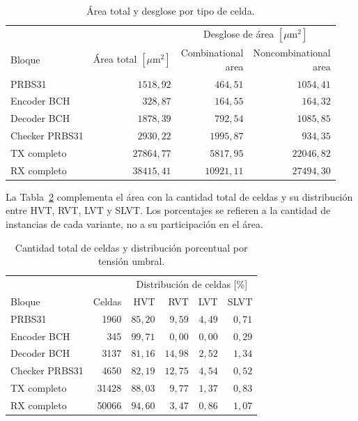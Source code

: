 \documentclass[10pt,a4paper]{article}
\begin{document}
\begin{table}[H]
    \centering
    \small
    \renewcommand{\arraystretch}{1.2}
    \begin{tabular}{@{}lrrr@{}}
        \toprule
        & & \multicolumn{2}{c}{Desglose de área $[\mu\mathrm{m}^{2}]$} \\
        \cmidrule(l){3-4}
        Bloque & \shortstack{Área total\\$[\mu\mathrm{m}^{2}]$} &
        \shortstack{Combinational\\area} &
        \shortstack{Noncombinational\\area} \\
        \midrule
        PRBS31          & $1518{,}92$  & $464{,}51$   & $1054{,}41$ \\
        Encoder BCH     & $328{,}87$   & $164{,}55$   & $164{,}32$ \\
        Decoder BCH     & $1878{,}39$  & $792{,}54$   & $1085{,}85$ \\
        Checker PRBS31  & $2930{,}22$  & $1995{,}87$  & $934{,}35$ \\
        TX completo     & $27864{,}77$ & $5817{,}95$  & $22046{,}82$ \\
        RX completo     & $38415{,}41$ & $10921{,}11$ & $27494{,}30$ \\
        \bottomrule
    \end{tabular}
    \caption{Área total y desglose por tipo de celda.}
    \label{tab:sintesis-area}
\end{table}

La Tabla~\ref{tab:sintesis-celdas-vt} complementa el área con la cantidad
total de celdas y su distribución entre HVT, RVT, LVT y SLVT.
Los porcentajes se refieren a la cantidad de instancias de cada variante,
no a su participación en el área.

\begin{table}[H]
    \centering
    \small
    \renewcommand{\arraystretch}{1.2}
    \begin{tabular}{@{}lrrrrr@{}}
        \toprule
        & & \multicolumn{4}{c}{Distribución de celdas [\%]} \\
        \cmidrule(l){3-6}
        Bloque & Celdas & HVT & RVT & LVT & SLVT \\
        \midrule
        PRBS31 & 1960 & $85{,}20$ & $9{,}59$ & $4{,}49$ & $0{,}71$ \\
        Encoder BCH & 345 & $99{,}71$ & $0{,}00$ & $0{,}00$ & $0{,}29$ \\
        Decoder BCH & 3137 & $81{,}16$ & $14{,}98$ & $2{,}52$ & $1{,}34$ \\
        Checker PRBS31 & 4650 & $82{,}19$ & $12{,}75$ & $4{,}54$ & $0{,}52$ \\
        TX completo & 31428 & $88{,}03$ & $9{,}77$ & $1{,}37$ & $0{,}83$ \\
        RX completo & 50066 & $94{,}60$ & $3{,}47$ & $0{,}86$ & $1{,}07$ \\
        \bottomrule
    \end{tabular}
    \caption{Cantidad total de celdas y distribución porcentual por tensión umbral.}
    \label{tab:sintesis-celdas-vt}
\end{table}
\end{document}
